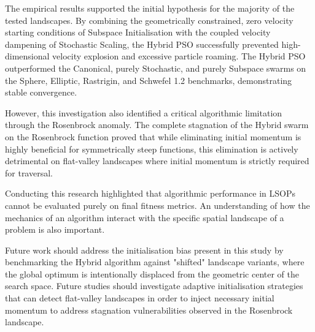 \documentclass[conference]{IEEEtran}
\begin{document}
The empirical results supported the initial hypothesis for the majority of the tested landscapes. By combining 
the geometrically constrained, zero velocity starting conditions of Subspace Initialisation with the  
coupled velocity dampening of Stochastic Scaling, the Hybrid PSO successfully prevented high-dimensional velocity 
explosion and excessive particle roaming. The Hybrid PSO outperformed the Canonical, 
purely Stochastic, and purely Subspace swarms on the Sphere, Elliptic, Rastrigin, and Schwefel 1.2 benchmarks, 
demonstrating stable convergence.

However, this investigation also identified a critical algorithmic limitation through the Rosenbrock anomaly. The 
complete stagnation of the Hybrid swarm on the Rosenbrock function proved that while eliminating initial momentum is 
highly beneficial for symmetrically steep functions, this elimination is actively detrimental on flat-valley landscapes 
where initial momentum is strictly required for traversal. 

Conducting this research highlighted that algorithmic performance in LSOPs cannot be evaluated purely on final 
fitness metrics. An understanding of how the mechanics of an algorithm interact with the specific spatial landscape of a problem is 
also important. 

Future work should address the initialisation bias present in this study by benchmarking the Hybrid 
algorithm against "shifted" landscape variants, where the global optimum is intentionally displaced from the geometric 
center of the search space. Future studies should investigate adaptive initialisation strategies that can  
detect flat-valley landscapes in order to inject necessary initial momentum to address stagnation 
vulnerabilities observed in the Rosenbrock landscape.
\end{document}
